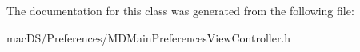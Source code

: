 The documentation for this class was generated from the following file\-:\begin{DoxyCompactItemize}
\item 
mac\-D\-S/\-Preferences/M\-D\-Main\-Preferences\-View\-Controller.\-h\end{DoxyCompactItemize}
